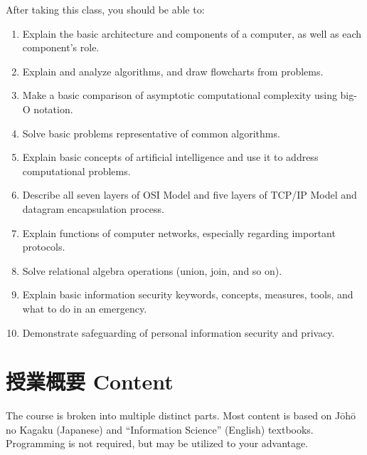 \documentclass{article}
\begin{document}
After taking this class, you should be able to:
\begin{enumerate}
    \item Explain the basic architecture and components of a computer, as well as each component's role.
   	\item Explain and analyze algorithms, and draw flowcharts from problems.
   	\item Make a basic comparison of asymptotic computational complexity using big-O notation.
   	\item Solve basic problems representative of common algorithms.
   	\item Explain basic concepts of artificial intelligence and use it to address computational problems.
   	\item Describe all seven layers of OSI Model and five layers of TCP/IP Model and datagram encapsulation process.
   	\item Explain functions of computer networks, especially regarding important protocols.
   	\item Solve relational algebra operations (union, join, and so on).
   	\item Explain basic information security keywords, concepts, measures, tools, and what to do in an emergency.
   	\item Demonstrate safeguarding of personal information security and privacy.
\end{enumerate}

\section{授業概要 Content}
The course is broken into multiple distinct parts. Most content is based on J\={o}h\={o} no Kagaku (Japanese) and ``Information Science'' (English) textbooks. Programming is not required, but may be utilized to your advantage.
\end{document}
